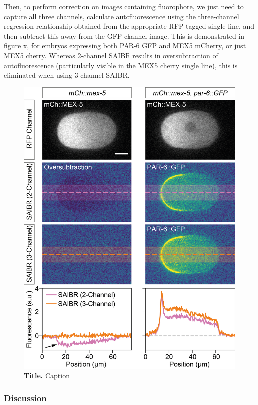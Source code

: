\documentclass[12pt]{"article"}
\newcommand{\mycaption}[2]{\caption[#1]{\textbf{#1.} #2}}
\begin{document}
Then, to perform correction on images containing fluorophore, we just need to capture all three channels, calculate autofluorescence using the three-channel regression relationship obtained from the appropriate RFP tagged single line, and then subtract this away from the GFP channel image. This is demonstrated in figure x, for embryos expressing both PAR-6 GFP and MEX5 mCherry, or just MEX5 cherry. Whereas 2-channel SAIBR results in oversubtraction of autofluorescence (particularly visible in the MEX5 cherry single line), this is eliminated when using 3-channel SAIBR.\\

\begin{figure}[!h]
\includegraphics[scale=1]{saibr_3channel_correction}
\setlength{\abovecaptionskip}{20pt}
\centering
\mycaption{Title}{Caption}
\label{fig:saibr_3channel_correction}
\end{figure}


\subsubsection{Discussion}
\end{document}
